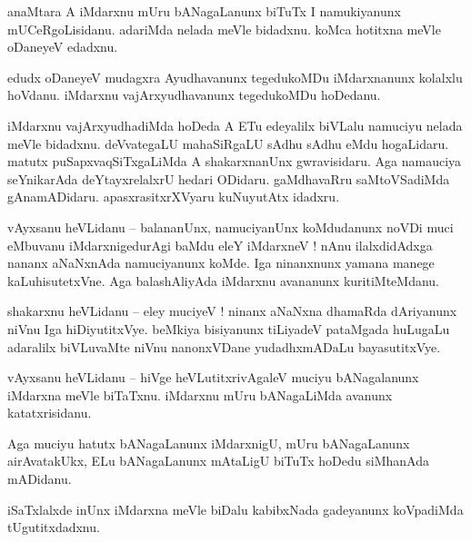 \documentclass{article}
\begin{document}
\begin{mng}%
anaMtara A iMdarxnu mUru bANagaLanunx biTuTx I namukiyanunx mUCeRgoLisidanu. adariMda nelada meVle 
bidadxnu. koMca hotitxna meVle oDaneyeV edadxnu.
\end{mng}

\begin{mng}%
edudx oDaneyeV mudagxra Ayudhavanunx tegedukoMDu iMdarxnanunx kolalxlu hoVdanu. iMdarxnu 
vajArxyudhavanunx tegedukoMDu hoDedanu.
\end{mng}

\begin{mng}%
iMdarxnu vajArxyudhadiMda hoDeda A ETu edeyalilx biVLalu namuciyu nelada meVle bidadxnu. 
deVvategaLU mahaSiRgaLU sAdhu sAdhu eMdu hogaLidaru. matutx puSapxvaqSiTxgaLiMda A shakarxnanUnx 
gwravisidaru. Aga namauciya seYnikarAda deYtayxrelalxrU hedari ODidaru. gaMdhavaRru saMtoVSadiMda 
gAnamADidaru. apasxrasitxrXVyaru kuNuyutAtx idadxru.
\end{mng}


\begin{mng}%
vAyxsanu heVLidanu -- balananUnx, namuciyanUnx koMdudanunx noVDi muci eMbuvanu iMdarxnigedurAgi 
baMdu eleY iMdarxneV ! nAnu ilalxdidAdxga nananx aNaNxnAda namuciyanunx koMde. Iga ninanxnunx 
yamana manege kaLuhisutetxVne. Aga balashAliyAda iMdarxnu avananunx kuritiMteMdanu.
\end{mng}

\begin{mng}%
shakarxnu heVLidanu -- eley muciyeV ! ninanx aNaNxna dhamaRda dAriyanunx niVnu Iga hiDiyutitxVye. 
beMkiya bisiyanunx tiLiyadeV pataMgada huLugaLu adaralilx biVLuvaMte niVnu nanonxVDane 
yudadhxmADaLu bayasutitxVye.
\end{mng}

\begin{mng}%
vAyxsanu heVLidanu -- hiVge heVLutitxrivAgaleV muciyu bANagalanunx iMdarxna meVle biTaTxnu. 
iMdarxnu mUru bANagaLiMda avanunx katatxrisidanu.
\end{mng}

\begin{mng}%
Aga muciyu hatutx bANagaLanunx iMdarxnigU, mUru bANagaLanunx airAvatakUkx, ELu bANagaLanunx 
mAtaLigU biTuTx hoDedu siMhanAda mADidanu.
\end{mng}

\begin{mng}%
iSaTxlalxde inUnx iMdarxna meVle biDalu kabibxNada gadeyanunx koVpadiMda tUgutitxdadxnu.
\end{mng}
\end{document}
